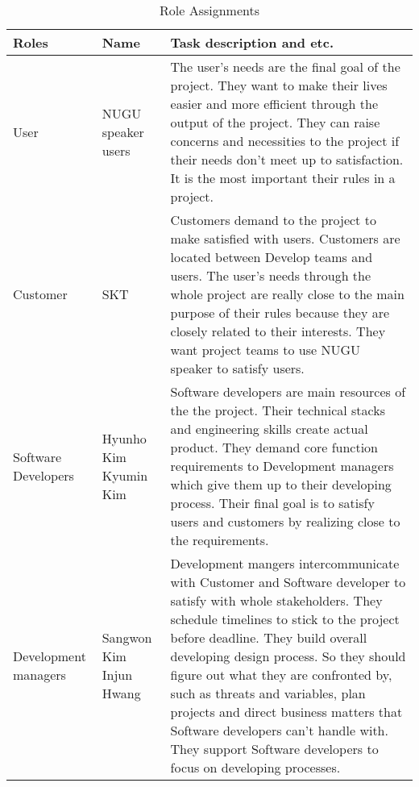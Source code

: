 \documentclass[conference]{IEEEtran}
\begin{document}
  \begin{table}[htbp]
  \renewcommand{\arraystretch}{1.7}
\caption{Role Assignments}
\begin{center}
\begin{tabular}{|p{1.5cm}|p{1.8cm}|p{4.2cm}|}
\hline
\textbf{Roles} & \textbf{{Name}}& \textbf{{Task description and etc.}} \\
\hline
User & NUGU speaker users & The user’s needs are the final goal of the project. They want to make their lives easier and more efficient through the output of the project. They can raise concerns and necessities to the project if their needs don’t meet up to satisfaction. It is the most important their rules in a project.  \\
\hline
Customer & SKT & Customers demand to the project to make satisfied with users. Customers are located between Develop teams and users. The user’s needs through the whole project are really close to the main purpose of their rules because they are closely related to their interests. They want project teams to use NUGU speaker to satisfy users.  \\
\hline
Software \linebreak Developers& Hyunho Kim \linebreak Kyumin Kim& Software developers are main resources of the the project. Their technical stacks and engineering skills create actual product. They demand core function requirements to Development managers which give them up to their developing process. Their final goal is to satisfy users and customers by realizing close to the requirements. \\
\hline
Development \linebreak managers& Sangwon Kim \linebreak Injun Hwang& Development mangers intercommunicate with Customer and Software developer to satisfy with whole stakeholders. They schedule timelines to stick to the project before deadline. They build overall developing design process. So they should figure out what they are confronted by, such as threats and variables, plan projects and direct business matters that Software developers can’t handle with. They support Software developers to focus on developing processes. \\
\hline
\end{tabular}
\label{tab1}
\end{center}
\end{table}
\end{document}
